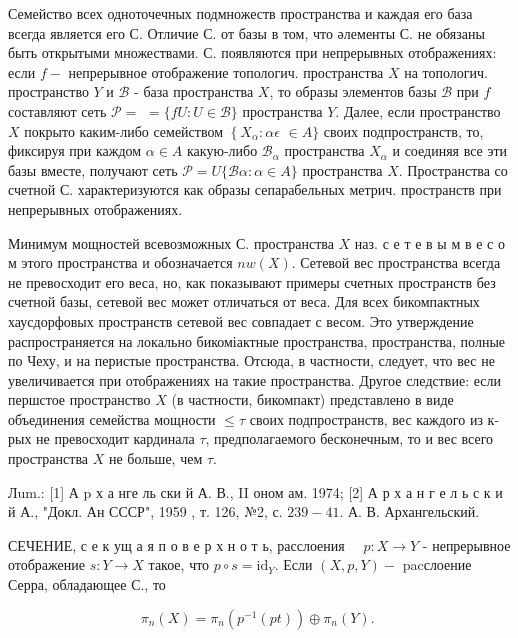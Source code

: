 \documentclass[10pt]{article}
\begin{document}
Семейство всех одноточечных подмножеств пространства и каждая его база всегда является его С. Отличие С. от базы в том, что әлементы С. не обязаны быть открытыми множествами. С. появляются при непрерывных отображениях: если $f-$ непрерывное отображение топологич. пространства $X$ на топологич. пространство $Y$ и $\mathscr{B}$ - база пространства $X$, то образы элементов базы $\mathscr{B}$ при $f$ составляют сеть $\mathscr{P}=$ $=\{f U: U \in \mathscr{B}\}$ пространства $Y$. Далее, если пространство $X$ покрыто каким-либо семейством $\left\{X_{\alpha}: \alpha \epsilon\right.$ $\in A\}$ своих подпространств, то, фиксируя при каждом $\alpha \in A$ какую-либо $\mathscr{B}_{\alpha}$ пространства $X_{\alpha}$ и соединяя все эти базы вместе, получают сеть $\mathscr{P}=U\{\mathcal{B} \alpha: \alpha \in A\}$ пространства $X$. Пространства со счетной С. характеризуются как образы сепарабельных метрич. пространств при непрерывных отображениях.



Минимум мощностей всевозможных С. пространства $X$ наз. с е т е в ы м в е с о м этого пространства и обозначается $n w(X)$. Сетевой вес пространства всегда не превосходит его веса, но, как показывают примеры счетных пространств без счетной базы, сетевой вес может отличаться от веса. Для всех бикомпактных хаусдорфовых пространств сетевой вес совпадает с весом. Это утверждение распространяется на локально бикоміактные пространства, пространства, полные по Чеху, и на перистые пространства. Отсюда, в частности, следует, что вес не увеличивается при отображениях на такие пространства. Другое следствие: если першстое пространство $X$ (в частности, бикомпакт) представлено в виде объединения семейства мощности $\leqslant \tau$ своих подпространств, вес каждого из к-рых не превосходит кардинала $\tau$, предполагаемого бесконечным, то и вес всего пространства $X$ не больше, чем $\tau$.



Лum.: [1] А p х а нге ль ски й А. В., II оном ам. 1974; [2] А р х а н г е л ь с к и й А., "Докл. Ан СССР", 1959 , т. 126, №2, с. $239-41$. А. В. Архангельский.



СЕЧЕНИЕ, с е к ущ а я п о в е р х н о т ь, расслоения $\quad p: X \rightarrow Y$ - непрерывное отображение $s: Y \rightarrow X$ такое, что $p \circ s=\mathrm{id}_{Y}$. Если $(X, p, Y)-$ pacслоение Серра, обладающее С., то



\[

\pi_{n}(X)=\pi_{n}\left(p^{-1}(p t)\right) \oplus \pi_{n}(Y) \text {. }

\]
\end{document}
